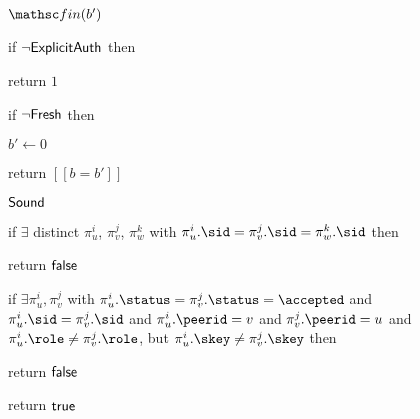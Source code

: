 \begin{figure}[tp]
\begin{minipage}[t]{0.49\textwidth}
\begin{oracle}{$\Finalize(b')$}
			\item if $\neg \mathsf{ExplicitAuth}$ then
			\iffull\item \hindent\fi return $1$
			
			\item if $\neg \mathsf{Fresh}$ then
			\iffull\item \hindent\fi $b' \gets 0$
			
			\item return $[[b = b']]$
		\end{oracle}
		
		\ExptSepSpace
		
		\begin{algorithm}{$\mathsf{Sound}$}
			\item if $\exists$ distinct $\pi_u^i$, $\pi_v^j$, $\pi_w^k$ with $\pi_u^i.\sid = \pi_v^j.\sid = \pi_w^k.\sid$ then
			\item \hindent return $\mathsf{false}$
			
			\item if $\exists \pi_u^i, \pi_v^j$ with \newline
				\null\hindent $\pi_u^i.\status = \pi_v^j.\status = \accepted$ \newline
				\null\hindent and $\pi_u^i.\sid = \pi_v^j.\sid$ \newline
				\null\hindent and $\pi_u^i.\peerid = v$ and $\pi_v^j.\peerid = u$ \newline
				\null\hindent and $\pi_u^i.\role \neq \pi_v^j.\role$, but $\pi_u^i.\skey \neq \pi_v^j.\skey$ then  
			\item \hindent return $\mathsf{false}$
			
			\item return $\mathsf{true}$
		\end{algorithm}
		
		\ExptSepSpace
		

\end{minipage}
\end{figure}
